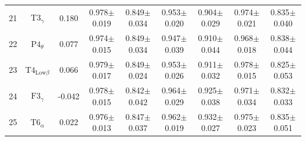 \documentclass[pdflatex,sn-mathphys]{sn-jnl}%
\theoremstyle{thmstyleone}%
\theoremstyle{thmstyletwo}%
\theoremstyle{thmstylethree}%
\begin{document}
\begin{appendices}
\begin{table}[h!]
{\begin{tabular}{r|cccccccc}
  21 &          $\text{T3}_{\gamma}$ &  0.180 &          0.978$\pm$0.019 &          0.849$\pm$0.034 &          0.953$\pm$0.020 &          0.904$\pm$0.029 &          0.974$\pm$0.021 &          0.835$\pm$0.040 \\
  22 &          $\text{P4}_{\theta}$ &  0.077 &          0.974$\pm$0.015 &          0.849$\pm$0.034 &          0.947$\pm$0.039 &          0.910$\pm$0.044 &          0.968$\pm$0.018 &          0.838$\pm$0.044 \\
  23 & $\text{T4}_{\text{Low}\beta}$ &  0.066 &          0.979$\pm$0.017 &          0.849$\pm$0.024 &          0.953$\pm$0.026 &          0.911$\pm$0.032 &          0.978$\pm$0.015 &          0.825$\pm$0.053 \\
  24 &          $\text{F3}_{\gamma}$ & -0.042 &          0.978$\pm$0.015 &          0.842$\pm$0.042 &          0.964$\pm$0.029 &          0.925$\pm$0.038 &          0.971$\pm$0.034 &          0.832$\pm$0.033 \\
  25 &          $\text{T6}_{\alpha}$ &  0.022 &          0.976$\pm$0.013 &          0.847$\pm$0.037 &          0.962$\pm$0.019 &          0.932$\pm$0.027 &          0.975$\pm$0.023 &          0.835$\pm$0.051 \\
\hline
\end{tabular}
}
\end{table}



\end{appendices}
\end{document}
